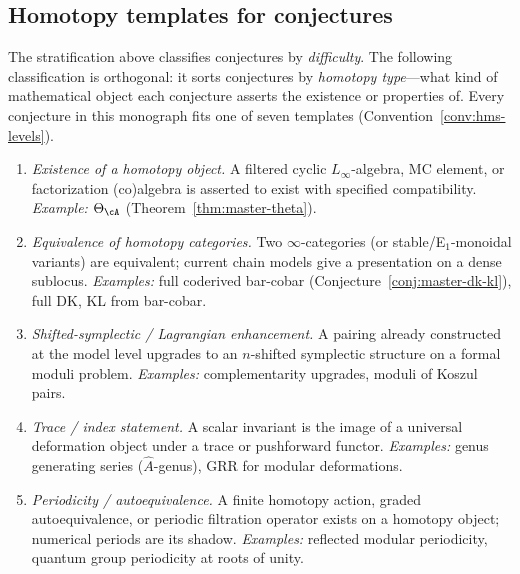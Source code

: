 \subsection{Homotopy templates for conjectures}
\label{subsec:homotopy-templates}

The stratification above classifies conjectures by \emph{difficulty}.
The following classification is orthogonal: it sorts conjectures by
\emph{homotopy type}---what kind of mathematical object each conjecture
asserts the existence or properties of.  Every conjecture in this
monograph fits one of seven templates
(Convention~\ref{conv:hms-levels}).

\begin{convention}\label{conv:homotopy-templates}
\begin{enumerate}[label=\textbf{Type \Roman*.}, leftmargin=3em]
\item \emph{Existence of a homotopy object.}
  A filtered cyclic $L_\infty$-algebra, MC element,
  or factorization (co)algebra is asserted to exist with specified
  compatibility.  \emph{Example:}
  $\Theta_{\cA}$ (Theorem~\ref{thm:master-theta}).

\item \emph{Equivalence of homotopy categories.}
  Two $\infty$-categories (or stable/E$_1$-monoidal variants)
  are equivalent; current chain models give a presentation on a
  dense sublocus.
  \emph{Examples:} full coderived bar-cobar
  (Conjecture~\ref{conj:master-dk-kl}),
  full DK, KL from bar-cobar.

\item \emph{Shifted-symplectic / Lagrangian enhancement.}
  A pairing already constructed at the model level upgrades to an
  $n$-shifted symplectic structure on a formal moduli problem.
  \emph{Examples:} complementarity upgrades, moduli of Koszul pairs.

\item \emph{Trace / index statement.}
  A scalar invariant is the image of a universal deformation object
  under a trace or pushforward functor.
  \emph{Examples:} genus generating series ($\hat{A}$-genus),
  GRR for modular deformations.

\item \emph{Periodicity / autoequivalence.}
  A finite homotopy action, graded autoequivalence, or periodic
  filtration operator exists on a homotopy object; numerical periods
  are its shadow.
  \emph{Examples:} reflected modular periodicity,
  quantum group periodicity at roots of unity.


\end{enumerate}
\end{convention}

